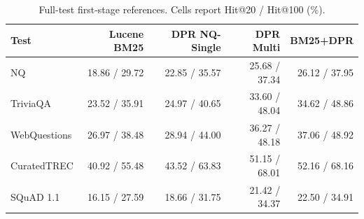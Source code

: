 \begin{table}[t]
\caption{Full-test first-stage references. Cells report Hit@20 / Hit@100 (\%).}
\label{tab:baselines}
\centering
\small
\begin{tabular}{lrrrr}
\toprule
Test & Lucene BM25 & DPR NQ-Single & DPR Multi & BM25+DPR \\
\midrule
NQ & 18.86 / 29.72 & 22.85 / 35.57 & 25.68 / 37.34 & 26.12 / 37.95\\
TriviaQA & 23.52 / 35.91 & 24.97 / 40.65 & 33.60 / 48.04 & 34.62 / 48.86\\
WebQuestions & 26.97 / 38.48 & 28.94 / 44.00 & 36.27 / 48.18 & 37.06 / 48.92\\
CuratedTREC & 40.92 / 55.48 & 43.52 / 63.83 & 51.15 / 68.01 & 52.16 / 68.16\\
SQuAD 1.1 & 16.15 / 27.59 & 18.66 / 31.75 & 21.42 / 34.37 & 22.50 / 34.91\\
\bottomrule
\end{tabular}
\end{table}

